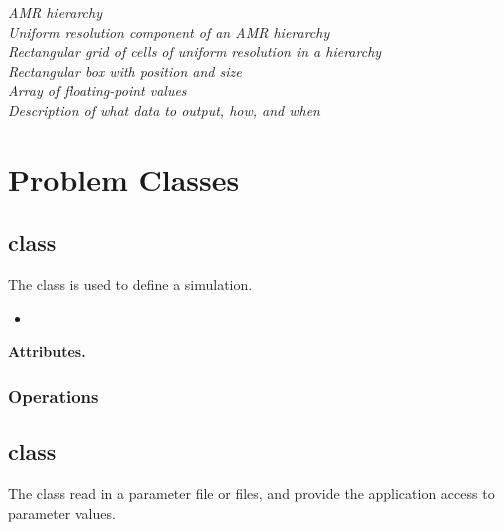 \documentclass{article}
\begin{document}
\begin{tabbing}
 \>\>\>         \>\> \textit{AMR hierarchy} \\
 \>\>\>             \>\> \textit{Uniform resolution component of an AMR hierarchy} \\
 \>\>\>             \>\> \textit{Rectangular grid of cells of uniform resolution in a hierarchy} \\
 \>\>\>\>               \> \textit{Rectangular box with position and size} \\
 \>\>\>\>             \> \textit{Array of floating-point values} \\
 \>\>            \>\>\> \textit{Description of what data to output, how, and when}
\end{tabbing}


\section{Problem Classes} \label{s:problem-classes}

\subsection{ class}

The  class is used to define a simulation.  
\begin{itemize}
\item {}
\end{itemize}

\textbf{Attributes.}

\subsubsection{Operations}

\subsection{ class}

The  class read in a parameter file or files, and
provide the application access to parameter values.
\end{document}

